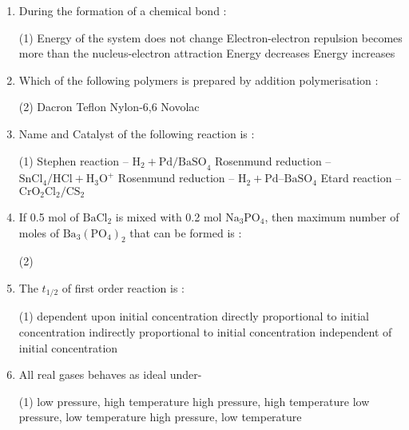 \documentclass[twocolumn]{article}
\begin{document}
\begin{enumerate}
    \item During the formation of a chemical bond :
    \begin{tasks}(1)
        \task Energy of the system does not change
        \task Electron-electron repulsion becomes more than the nucleus-electron attraction
        \task Energy decreases
        \task Energy increases
    \end{tasks}
    
    \item Which of the following polymers is prepared by addition polymerisation :
    \begin{tasks}(2)
        \task Dacron
        \task Teflon
        \task Nylon-6,6
        \task Novolac
    \end{tasks}
    
    \item Name and Catalyst of the following reaction is :
    \begin{center}
    \end{center}
    \begin{tasks}(1)
        \task Stephen reaction – $\text{H}_2 + \text{Pd/BaSO}_4$
        \task Rosenmund reduction – $\text{SnCl}_4/\text{HCl}+\text{H}_3\text{O}^+$
        \task Rosenmund reduction – $\text{H}_2+\text{Pd} – \text{BaSO}_4$
        \task Etard reaction – $\text{CrO}_2\text{Cl}_2/\text{CS}_2$
    \end{tasks}
    
    \item If 0.5 mol of $\text{BaCl}_2$ is mixed with 0.2 mol $\text{Na}_3\text{PO}_4$, then maximum number of moles of $\text{Ba}_3(\text{PO}_4)_2$ that can be formed is :
    \begin{tasks}(2)
    \end{tasks}
    
    \item The $t_{1/2}$ of first order reaction is :
    \begin{tasks}(1)
        \task dependent upon initial concentration
        \task directly proportional to initial concentration
        \task indirectly proportional to initial concentration
        \task independent of initial concentration
    \end{tasks}
    
    \item All real gases behaves as ideal under-
    \begin{tasks}(1)
        \task low pressure, high temperature
        \task high pressure, high temperature
        \task low pressure, low temperature
        \task high pressure, low temperature
    \end{tasks}
    

\end{enumerate}
\end{document}
